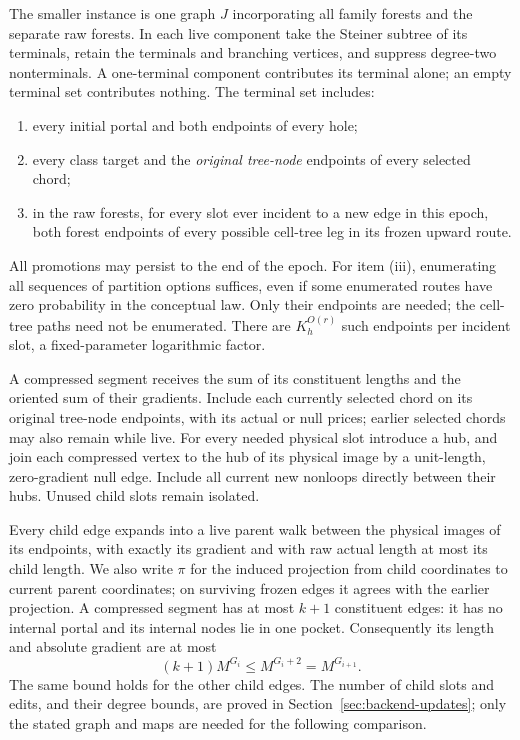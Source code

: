 The smaller instance is one graph $J$ incorporating all family
forests and the separate raw forests.  In each live component take
the Steiner subtree of its terminals, retain the terminals and
branching vertices, and suppress degree-two nonterminals.  A
one-terminal component contributes its terminal alone; an empty
terminal set contributes nothing.  The terminal set includes:
\begin{enumerate}[label=(\roman*)]
\item every initial portal and both endpoints of every hole;
\item every class target and the \emph{original tree-node} endpoints
of every selected chord;
\item in the raw forests, for every slot ever incident to a new edge
in this epoch, both forest endpoints of every possible cell-tree leg
in its frozen upward route.
\end{enumerate}
All promotions may persist to the end of the epoch.  For item (iii),
enumerating all sequences of partition options suffices, even if some
enumerated routes have zero probability in the conceptual law.
Only their endpoints are needed; the cell-tree paths need not be
enumerated.  There are $K_h^{O(r)}$ such endpoints per incident slot,
a fixed-parameter logarithmic factor.

A compressed segment receives the sum of its constituent lengths
and the oriented sum of their gradients.  Include each currently
selected chord on its original tree-node endpoints, with its actual
or null prices; earlier selected chords may also remain while live.
For every needed physical slot introduce a hub, and join each
compressed vertex to the hub of its physical image by a unit-length,
zero-gradient null edge.  Include all current new nonloops directly
between their hubs.  Unused child slots remain isolated.

Every child edge expands into a live parent walk between the physical
images of its endpoints, with exactly its gradient and with raw
actual length at most its child length.  We also write $\pi$ for the
induced projection from child coordinates to current parent coordinates;
on surviving frozen edges it agrees with the earlier projection.
A compressed segment has at
most $k+1$ constituent edges: it has no internal portal and its
internal nodes lie in one pocket.  Consequently its length and
absolute gradient are at most
\[
                  (k+1)M^{G_i}\le M^{G_i+2}=M^{G_{i+1}}.
\]
The same bound holds for the other child edges.  The number of child
slots and edits, and their degree bounds, are proved in
Section~\ref{sec:backend-updates}; only the stated graph and maps are
needed for the following comparison.

